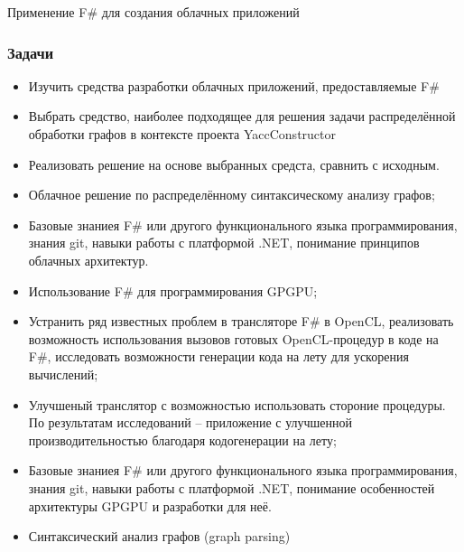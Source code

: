 \documentclass{beamer}
\begin{document}
\begin{frame}[plain,c]
 \transwipe[direction=90]
 \begin{center}
  \Huge Применение F\# для создания облачных приложений
 \end{center}
\end{frame}

\begin{frame}[fragile]
\transwipe[direction=90]
\frametitle{Задачи}
\begin{itemize}
\item Изучить средства разработки облачных приложений, предоставляемые F\#
\item Выбрать средство, наиболее подходящее для решения задачи распределённой обработки графов в контексте проекта YaccConstructor
\item Реализовать решение на основе выбранных средста, сравнить с исходным.
\item Облачное решение по распределённому синтаксическому анализу графов;
\item Базовые знаниея F\# или другого функционального языка программирования, знания git, навыки работы с платформой .NET, понимание принципов облачных архитектур.


\item  Использование F\# для программирования GPGPU;
\item  Устранить ряд известных проблем в трансляторе F\# в OpenCL, реализовать возможность использования вызовов готовых OpenCL-процедур в коде на F\#, исследовать возможности генерации кода на лету для ускорения вычислений;
\item  Улучшеный транслятор с возможностью использовать стороние процедуры. По результатам исследований -- приложение с улучшенной производительностью благодаря кодогенерации на лету;
\item  Базовые знаниея F\# или другого функционального языка программирования, знания git, навыки работы с платформой .NET, понимание особенностей архитектуры GPGPU и разработки для неё.

\item Синтаксический анализ графов (graph parsing)
\end{itemize}

\end{frame}
\end{document}
